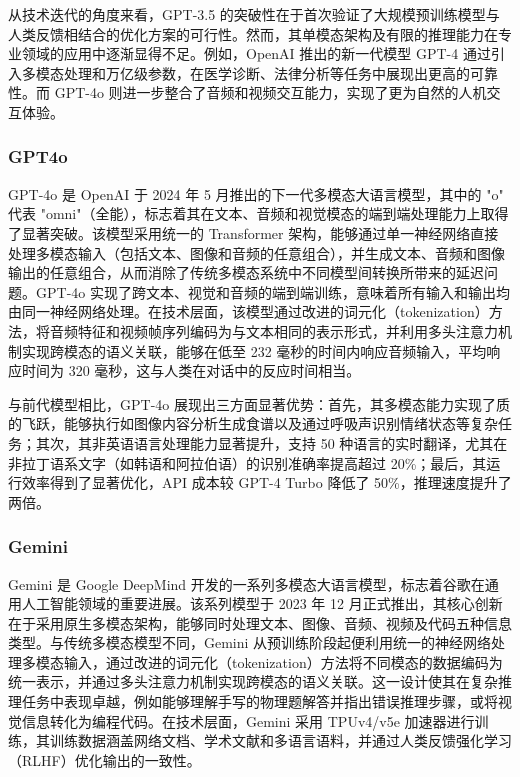 从技术迭代的角度来看，GPT-3.5 的突破性在于首次验证了大规模预训练模型与人类反馈相结合的优化方案的可行性。然而，其单模态架构及有限的推理能力在专业领域的应用中逐渐显得不足。例如，OpenAI 推出的新一代模型 GPT-4 通过引入多模态处理和万亿级参数，在医学诊断、法律分析等任务中展现出更高的可靠性。而 GPT-4o 则进一步整合了音频和视频交互能力，实现了更为自然的人机交互体验。

\subsubsection{GPT4o}
\label{sec:TOSWT-gen-gpt4o}

GPT-4o \cite{gpt4o} 是 OpenAI 于 2024 年 5 月推出的下一代多模态大语言模型，其中的 "o" 代表 "omni"（全能），标志着其在文本、音频和视觉模态的端到端处理能力上取得了显著突破。该模型采用统一的 Transformer 架构，能够通过单一神经网络直接处理多模态输入（包括文本、图像和音频的任意组合），并生成文本、音频和图像输出的任意组合，从而消除了传统多模态系统中不同模型间转换所带来的延迟问题。GPT-4o 实现了跨文本、视觉和音频的端到端训练，意味着所有输入和输出均由同一神经网络处理。在技术层面，该模型通过改进的词元化（tokenization）方法，将音频特征和视频帧序列编码为与文本相同的表示形式，并利用多头注意力机制实现跨模态的语义关联，能够在低至 232 毫秒的时间内响应音频输入，平均响应时间为 320 毫秒，这与人类在对话中的反应时间相当。

与前代模型相比，GPT-4o 展现出三方面显著优势：首先，其多模态能力实现了质的飞跃，能够执行如图像内容分析生成食谱以及通过呼吸声识别情绪状态等复杂任务；其次，其非英语语言处理能力显著提升，支持 50 种语言的实时翻译，尤其在非拉丁语系文字（如韩语和阿拉伯语）的识别准确率提高超过 20\%；最后，其运行效率得到了显著优化，API 成本较 GPT-4 Turbo 降低了 50\%，推理速度提升了两倍。

\subsubsection{Gemini}
\label{sec:TOSWT-gen-gemini}

Gemini \cite{geminiteam2024geminifamilyhighlycapable} 是 Google DeepMind 开发的一系列多模态大语言模型，标志着谷歌在通用人工智能领域的重要进展。该系列模型于 2023 年 12 月正式推出，其核心创新在于采用原生多模态架构，能够同时处理文本、图像、音频、视频及代码五种信息类型。与传统多模态模型不同，Gemini 从预训练阶段起便利用统一的神经网络处理多模态输入，通过改进的词元化（tokenization）方法将不同模态的数据编码为统一表示，并通过多头注意力机制实现跨模态的语义关联。这一设计使其在复杂推理任务中表现卓越，例如能够理解手写的物理题解答并指出错误推理步骤，或将视觉信息转化为编程代码。在技术层面，Gemini 采用 TPUv4/v5e 加速器进行训练，其训练数据涵盖网络文档、学术文献和多语言语料，并通过人类反馈强化学习 \cite{kaufmann2024surveyreinforcementlearninghuman} （RLHF）优化输出的一致性。


